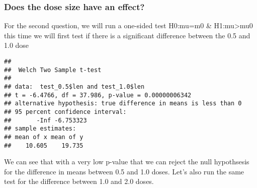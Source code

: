 \documentclass[
]{article}
\newenvironment{Shaded}{\begin{snugshade}}{\end{snugshade}}
\newcommand{\DataTypeTok}[1]{\textcolor[rgb]{0.13,0.29,0.53}{#1}}
\newcommand{\FloatTok}[1]{\textcolor[rgb]{0.00,0.00,0.81}{#1}}
\newcommand{\KeywordTok}[1]{\textcolor[rgb]{0.13,0.29,0.53}{\textbf{#1}}}
\newcommand{\NormalTok}[1]{#1}
\newcommand{\OperatorTok}[1]{\textcolor[rgb]{0.81,0.36,0.00}{\textbf{#1}}}
\newcommand{\StringTok}[1]{\textcolor[rgb]{0.31,0.60,0.02}{#1}}
\begin{document}
\hypertarget{does-the-dose-size-have-an-effect}{%
\subsubsection{Does the dose size have an
effect?}\label{does-the-dose-size-have-an-effect}}

For the second question, we will run a one-sided test H0:mu=m0 \&
H1:mu\textgreater mu0 this time we will first test if there is a
significant difference between the 0.5 and 1.0 dose

\begin{Shaded}
\end{Shaded}

\begin{verbatim}
## 
##  Welch Two Sample t-test
## 
## data:  test_0.5$len and test_1.0$len
## t = -6.4766, df = 37.986, p-value = 0.00000006342
## alternative hypothesis: true difference in means is less than 0
## 95 percent confidence interval:
##       -Inf -6.753323
## sample estimates:
## mean of x mean of y 
##    10.605    19.735
\end{verbatim}

We can see that with a very low p-value that we can reject the null
hypothsesis for the difference in means between 0.5 and 1.0 doses. Let's
also run the same test for the difference between 1.0 and 2.0 doses.

\begin{Shaded}
\end{Shaded}
\end{document}
